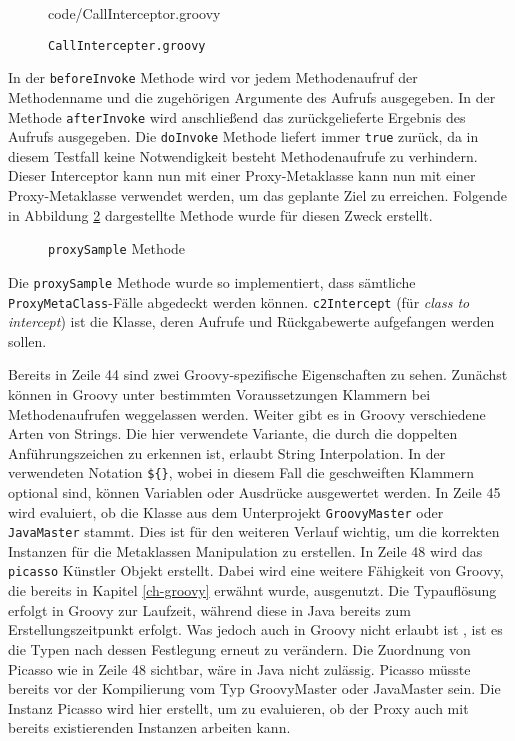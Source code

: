 \begin{figure}[hbt!]
	 {code/CallInterceptor.groovy}
	\caption{\texttt{CallIntercepter.groovy}}
	\label{fig:CallInterceptor.groovy}
\end{figure}

In der \texttt{beforeInvoke} Methode wird vor jedem Methodenaufruf der Methodenname und die zugehörigen Argumente des Aufrufs ausgegeben. 
In der Methode \texttt{afterInvoke} wird anschließend das zurückgelieferte Ergebnis des Aufrufs ausgegeben. 
Die \texttt{doInvoke} Methode liefert immer \texttt{true} zurück, da in diesem Testfall keine Notwendigkeit besteht Methodenaufrufe zu verhindern. 
Dieser Interceptor kann nun mit einer Proxy-Metaklasse kann nun mit einer Proxy-Metaklasse verwendet werden, um das geplante Ziel zu erreichen.
Folgende in Abbildung \ref{fig:MetaTester-proxySample} dargestellte Methode wurde für diesen Zweck erstellt.


\begin{figure}[hbt!]
	
	\caption{\texttt{proxySample} Methode}
	\label{fig:MetaTester-proxySample}
\end{figure}

Die \texttt{proxySample} Methode wurde so implementiert, dass sämtliche \texttt{ProxyMetaClass}-Fälle abgedeckt werden können. 
\texttt{c2Intercept} (für \textit{class to intercept}) ist die Klasse, deren Aufrufe und Rückgabewerte aufgefangen werden sollen.

Bereits in Zeile 44 sind zwei Groovy-spezifische Eigenschaften zu sehen. 
Zunächst können in Groovy unter bestimmten Voraussetzungen Klammern bei Methodenaufrufen weggelassen werden.
Weiter gibt es in Groovy verschiedene Arten von Strings. 
Die hier verwendete Variante, die durch die doppelten Anführungszeichen zu erkennen ist, erlaubt String Interpolation.
In der verwendeten Notation \texttt{\$\{\}}, wobei in diesem Fall die geschweiften Klammern optional sind, können Variablen oder Ausdrücke ausgewertet werden.
In Zeile 45 wird evaluiert, ob die Klasse aus dem Unterprojekt \texttt{GroovyMaster} oder \texttt{JavaMaster} stammt. 
Dies ist für den weiteren Verlauf wichtig, um die korrekten Instanzen für die Metaklassen Manipulation zu erstellen.
In Zeile 48 wird das \texttt{picasso} Künstler Objekt erstellt. 
Dabei wird eine weitere Fähigkeit von Groovy, die bereits in Kapitel \ref{ch-groovy} erwähnt wurde, ausgenutzt.
Die Typauflösung erfolgt in Groovy zur Laufzeit, während diese in Java bereits zum Erstellungszeitpunkt erfolgt. 
Was jedoch auch in Groovy nicht erlaubt ist , ist es die Typen nach dessen Festlegung erneut zu verändern. 
Die Zuordnung von Picasso wie in Zeile 48 sichtbar, wäre in Java nicht zulässig. 
Picasso müsste bereits vor der Kompilierung vom Typ GroovyMaster oder JavaMaster sein. 
Die Instanz Picasso wird hier erstellt, um zu evaluieren, ob der Proxy auch mit bereits existierenden Instanzen arbeiten kann.

